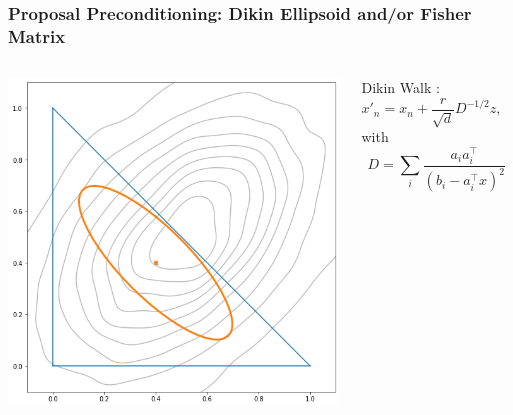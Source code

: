 \begin{frame}[t]
    \frametitle{Proposal Preconditioning: Dikin Ellipsoid and/or Fisher Matrix}
    \begin{columns}
    \begin{column}{0.45\textwidth}
        \begin{center}
        \includegraphics[width=\textwidth]{imgs/dikin-ellipsoid}
        \end{center}
    \end{column}
    \begin{column}{0.45\textwidth}
        Dikin Walk \cite{Kannan2012}:
        \[
            x'_{n} = x_n + \frac{r}{\sqrt{d}}D^{-1/2}z, \quad z \sim \mathcal{N}(0,I)
        \]
        with
        \[
            D = \sum_i \frac{a_i a_i^\top}{(b_i - a_i^\top x)^2} 
        \]
    \end{column}
    \end{columns}
\end{frame}

